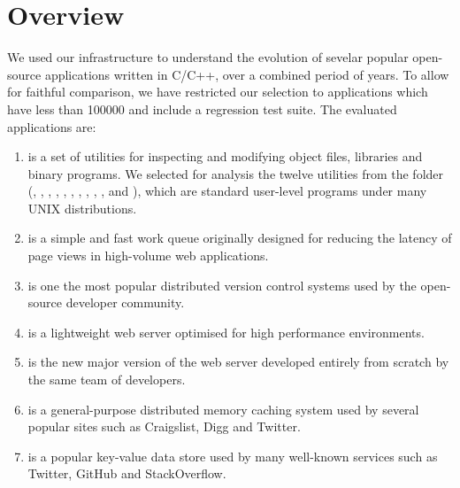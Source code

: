 \section{Overview}
\label{evolution:overview}

We used our infrastructure to understand the evolution of sevelar popular
open-source applications written in C/C++, over a combined period of \numYears
years. To allow for faithful comparison, we have restricted our selection to
applications which have less than \SI{100000}{\eloc} and include a regression
test suite. The \numSystems evaluated applications are:

\begin{enumerate}

\item[\gnu~\binutils\footnote{\url{http://www.gnu.org/software/binutils/}}]
is a set of utilities for inspecting and modifying object files,
libraries and binary programs.  We selected for analysis the twelve
utilities from the  folder (, ,
, , , , ,
, , ,  and ),
which are standard user-level programs under many UNIX distributions.

\item[\beanstalkd\footnote{\url{http://kr.github.io/beanstalkd/}}]
is a simple and fast work queue originally designed for reducing the latency of
page views in high-volume web applications.

\item[\git\footnote{\url{http://git-scm.com/}}]
is one the most popular distributed version control systems used by the
open-source developer community.

\item[\lighttpd\footnote{\url{http://www.lighttpd.net/}}]
is a lightweight web server optimised for high performance environments.

\item[\lighttpdtwo\footnote{\url{http://redmine.lighttpdtwo.net/projects/lighttpdtwo2/}}]
is the new major version of the \lighttpd web server developed entirely from
scratch by the same team of developers.

\item[\memcached\footnote{\url{http://memcached.org/}}]
is a general-purpose distributed memory caching system used by several popular
sites such as Craigslist, Digg and Twitter.

\item[\redis\footnote{\url{http://redis.io/}}]
is a popular key-value data store used by many well-known services such as
Twitter, GitHub and StackOverflow.


\end{enumerate}
